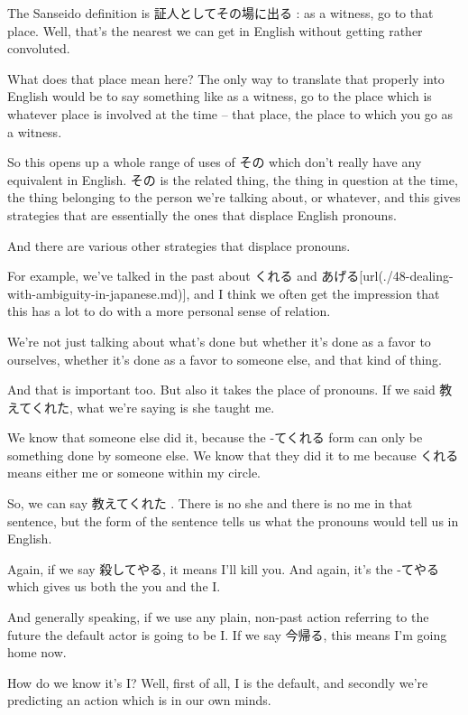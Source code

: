 The Sanseido definition is 証人としてその場に出る : as a witness, go to that place. Well, that's the nearest we can get in English without getting rather convoluted.

What does that place mean here? The only way to translate that properly into English would be to say something like as a witness, go to the place which is whatever place is involved at the time -- that place, the place to which you go as a witness.

{}

So this opens up a whole range of uses of その which don't really have any equivalent in English. その is the related thing, the thing in question at the time, the thing belonging to the person we're talking about, or whatever, and this gives strategies that are essentially the ones that displace English pronouns.

And there are various other strategies that displace pronouns.

For example, we've talked in the past about くれる and あげる\goto{{[}48{]}}[url(./48-dealing-with-ambiguity-in-japanese.md)], and I think we often get the impression that this has a lot to do with a more personal sense of relation.

{}

We're not just talking about what's done but whether it's done as a favor to ourselves, whether it's done as a favor to someone else, and that kind of thing.

And that is important too. But also it takes the place of pronouns. If we said 教えてくれた, what we're saying is she taught me.

We know that someone else did it, because the -てくれる form can only be something done by someone else. We know that they did it to me because くれる means either me or someone within my circle.

So, we can say 教えてくれた . There is no she and there is no me in that sentence, but the form of the sentence tells us what the pronouns would tell us in English.

Again, if we say 殺してやる, it means I'll kill you. And again, it's the -てやる which gives us both the you and the I.

And generally speaking, if we use any plain, non-past action referring to the future the default actor is going to be I. If we say 今帰る, this means I'm going home now.

How do we know it's I? Well, first of all, I is the default, and secondly we're predicting an action which is in our own minds.

